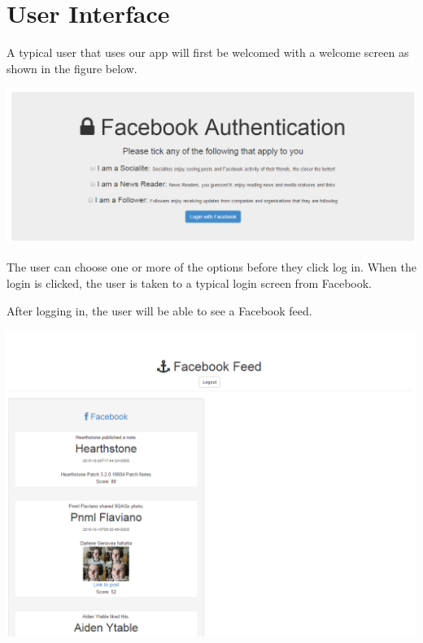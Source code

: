 \newpage
\section{User Interface}

A typical user that uses our app will first be welcomed with a welcome screen as shown in the figure below.

\begin{center}
\includegraphics[scale=0.5]{images/mainscreen.png}
\end{center}

The user can choose one or more of the options before they click log in. When the login is clicked, the user is taken to a typical login screen from Facebook.

After logging in, the user will be able to see a Facebook feed.

\begin{center}
\includegraphics[scale=0.5]{images/rankedFeed.png}
\end{center}

